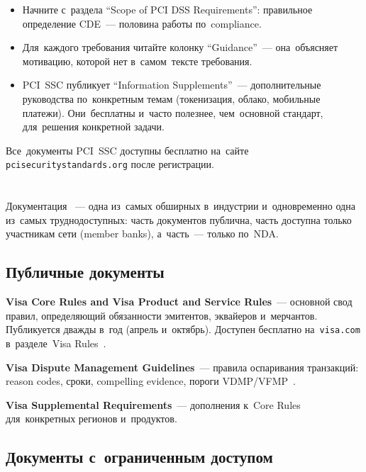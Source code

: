 \begin{itemize}
  \item Начните с~раздела \enquote{Scope of PCI DSS
          Requirements}: правильное определение CDE~--- половина
        работы по~compliance.
  \item Для~каждого требования читайте колонку
        \enquote{Guidance}~--- она~объясняет мотивацию,
        которой нет в~самом~тексте требования.
  \item PCI~SSC публикует \enquote{Information Supplements}~---
        дополнительные руководства по~конкретным темам
        (токенизация, облако, мобильные платежи). Они~бесплатны
        и~часто полезнее, чем~основной стандарт, для~решения
        конкретной задачи.
\end{itemize}

Все~документы PCI~SSC доступны бесплатно на~сайте
\texttt{pcisecuritystandards.org} после регистрации.


\section{}
\label{sec:ps-visa}

Документация ~--- одна из~самых обширных
в~индустрии и~одновременно одна из~самых труднодоступных:
часть документов публична, часть доступна только участникам
сети (member banks), а~часть~--- только по~NDA.

\subsection*{Публичные документы}

\textbf{Visa Core Rules and Visa Product and Service Rules}~---
основной свод правил, определяющий обязанности эмитентов,
эквайеров и~мерчантов. Публикуется дважды в~год (апрель
и~октябрь). Доступен бесплатно на~\texttt{visa.com}
в~разделе~Visa
Rules~.

\textbf{Visa Dispute Management Guidelines}~--- правила
оспаривания транзакций: reason codes, сроки, compelling
evidence, пороги VDMP/VFMP~.

\textbf{Visa Supplemental Requirements}~--- дополнения
к~Core Rules для~конкретных регионов и~продуктов.

\subsection*{Документы с~ограниченным доступом}

